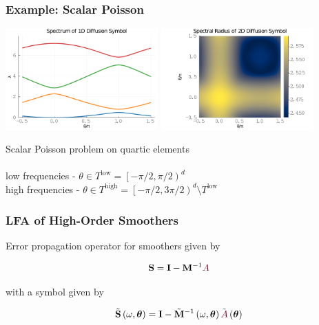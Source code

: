 \documentclass{beamer}
\begin{document}
\begin{frame}
\begin{center}
\frametitle{Example: Scalar Poisson}

\includegraphics[height=3.9cm]{../img/diffusionSymbol1D}
\includegraphics[height=3.9cm]{../img/diffusionSymbol2D}

Scalar Poisson problem on quartic elements\\

~\\

low frequencies - $\theta \in T^{\text{low}} = \left[ - \pi / 2, \pi / 2 \right)^d$\\

high frequencies - $\theta \in T^{\text{high}} = \left[ - \pi / 2, 3 \pi / 2 \right)^d \setminus T^{\text{low}}$

\end{center}
\end{frame}


\begin{frame}
\begin{center}
\frametitle{LFA of High-Order Smoothers}

Error propagation operator for smoothers given by

\begin{equation}
\mathbf{S} = \mathbf{I} - \mathbf{M}^{-1} {\color{burgundy}A}
\end{equation}

with a symbol given by

\begin{equation}
\tilde{\mathbf{S}} \left( \omega, \boldsymbol{\theta} \right) = \mathbf{I} - \tilde{\mathbf{M}}^{-1} \left( \omega, \boldsymbol{\theta} \right) \tilde{{\color{burgundy}A}} \left( \boldsymbol{\theta} \right)
\end{equation}

\end{center}
\end{frame}
\end{document}
